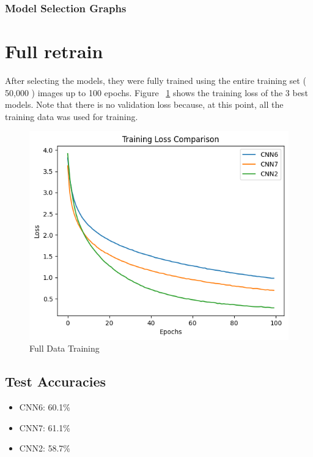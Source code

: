 \documentclass[conference]{IEEEtran}
\begin{document}
\subsubsection{Model Selection Graphs}

\section{Full retrain} \label{sec: full retrain}
After selecting the models, they were fully trained using the entire training set ( 50,000 ) images up to 100 epochs.
Figure ~\ref{fig: full data training} shows the training loss of the 3 best models. Note that there is no validation loss because, at this point, all the training data was used for training.
\begin{figure}[H]
    \centering
    \includegraphics[width=1\linewidth]{Full_Data_Training.png}
    \caption{Full Data Training}
    \label{fig: full data training}
\end{figure}

\subsection{Test Accuracies }
\begin{itemize}
    \item CNN6: 60.1\%
    \item CNN7: 61.1\%
    \item CNN2: 58.7\%
\end{itemize}
\end{document}
